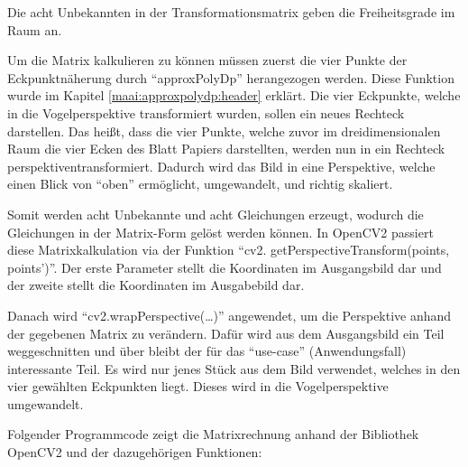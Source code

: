 Die acht Unbekannten in der Transformationsmatrix geben die Freiheitsgrade im Raum an.

Um die Matrix kalkulieren zu können müssen zuerst die vier Punkte der Eckpunktnäherung durch ``approxPolyDp'' herangezogen werden. Diese Funktion wurde im Kapitel \ref{maai:approxpolydp:header} erklärt. Die vier Eckpunkte, welche in die Vogelperspektive transformiert wurden, sollen ein neues Rechteck darstellen. Das heißt, dass die vier Punkte, welche zuvor im dreidimensionalen Raum die vier Ecken des Blatt Papiers darstellten, werden nun in ein Rechteck perspektiventransformiert. Dadurch wird das Bild in eine Perspektive, welche einen Blick von ``oben'' ermöglicht, umgewandelt, und richtig skaliert.

Somit werden acht Unbekannte und acht Gleichungen erzeugt, wodurch die Gleichungen in der Matrix-Form gelöst werden können. In OpenCV2 passiert diese Matrixkalkulation via der Funktion ``cv2. getPerspectiveTransform(points, points')''. Der erste Parameter stellt die Koordinaten im Ausgangsbild dar und der zweite stellt die Koordinaten im Ausgabebild dar.

Danach wird ``cv2.wrapPerspective(\dots)'' angewendet, um die Perspektive anhand der gegebenen Matrix zu verändern. Dafür wird aus dem Ausgangsbild ein Teil weggeschnitten und über bleibt der für das ``use-case'' (Anwendungsfall) interessante Teil. Es wird nur jenes Stück aus dem Bild verwendet, welches in den vier gewählten Eckpunkten liegt. Dieses wird in die Vogelperspektive umgewandelt.

Folgender Programmcode zeigt die Matrixrechnung anhand der Bibliothek OpenCV2 und der dazugehörigen Funktionen:



